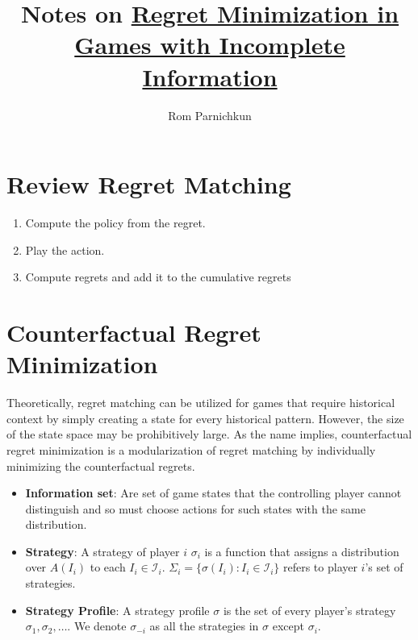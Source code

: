\documentclass[twocolumn]{article}
\begin{document}
\title{Notes on \href{https://proceedings.neurips.cc/paper/2007/file/08d98638c6fcd194a4b1e6992063e944-Paper.pdf}{Regret Minimization in Games with Incomplete Information}}
\author{Rom Parnichkun}

\maketitle

\section{Review Regret Matching}

\begin{tcolorbox}[colback=blue!5!white,colframe=blue!15!white,coltitle=black, boxrule=0pt,title=Algorithm, drop shadow southeast, enhanced]
\begin{enumerate}
    \item Compute the policy from the regret.
    \item Play the action.
    \item Compute regrets and add it to the cumulative regrets
\end{enumerate}
\end{tcolorbox}

\section{Counterfactual Regret Minimization}

Theoretically, regret matching can be utilized for games that require historical context by simply creating a state for every historical pattern. However, the size of the state space may be prohibitively large. As the name implies, counterfactual regret minimization is a modularization of regret matching by individually minimizing the counterfactual regrets.

\begin{tcolorbox}[colback=blue!5!white,colframe=blue!15!white,coltitle=black, boxrule=0pt,title=Keywords, drop shadow southeast, enhanced]
    \begin{itemize}
        \item \textbf{Information set}: Are set of game states that the controlling player cannot distinguish and so must choose actions for such states with the same distribution.
        \item \textbf{Strategy}: A strategy of player $i$ $\sigma_i$ is a function that assigns a distribution over $A(I_i)$ to each $I_i \in \mathcal{I}_i$. $\Sigma_i = \{\sigma(I_i) : I_i \in \mathcal{I}_i\}$ refers to player $i$'s set of strategies. 
        \item \textbf{Strategy Profile}: A strategy profile $\sigma$ is the set of every player's strategy $\sigma_1, \sigma_2, \dots$. We denote $\sigma_{-i}$ as all the strategies in $\sigma$ except $\sigma_i$.
    \end{itemize}
\end{tcolorbox}
\end{document}
